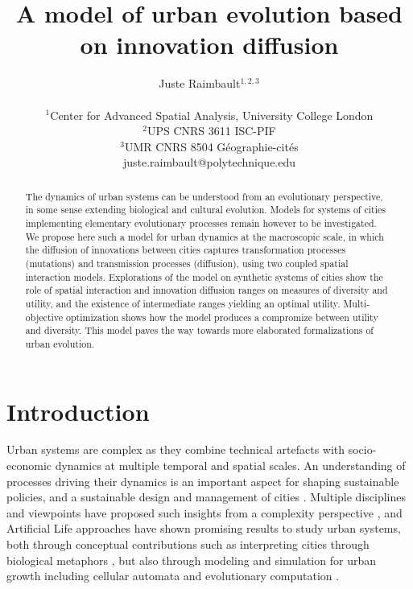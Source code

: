 \documentclass[letterpaper]{article}
\title{A model of urban evolution based on innovation diffusion}
\author{Juste Raimbault$^{1,2,3}$\\
\mbox{}\\
$^1$Center for Advanced Spatial Analysis, University College London\\
$^2$UPS CNRS 3611 ISC-PIF\\
$^3$UMR CNRS 8504 G{\'e}ographie-cit{\'e}s\medskip\\
juste.raimbault@polytechnique.edu} %
\begin{document}
\maketitle

\begin{abstract}
The dynamics of urban systems can be understood from an evolutionary perspective, in some sense extending biological and cultural evolution. Models for systems of cities implementing elementary evolutionary processes remain however to be investigated. We propose here such a model for urban dynamics at the macroscopic scale, in which the diffusion of innovations between cities captures transformation processes (mutations) and transmission processes (diffusion), using two coupled spatial interaction models. Explorations of the model on synthetic systems of cities show the role of spatial interaction and innovation diffusion ranges on measures of diversity and utility, and the existence of intermediate ranges yielding an optimal utility. Multi-objective optimization shows how the model produces a compromize between utility and diversity. This model paves the way towards more elaborated formalizations of urban evolution.
\end{abstract}



\section{Introduction}



Urban systems are complex as they combine technical artefacts with socio-economic dynamics at multiple temporal and spatial scales. An understanding of processes driving their dynamics is an important aspect for shaping sustainable policies, and a sustainable design and management of cities \citep{lobo2020urban}. Multiple disciplines and viewpoints have proposed such insights from a complexity perspective \citep{pumain2020conclusion}, and Artificial Life approaches have shown promising results to study urban systems, both through conceptual contributions such as interpreting cities through biological metaphors \citep{batty2009centenary}, but also through modeling and simulation for urban growth including cellular automata and evolutionary computation \citep{raimbault2020cities}.


\end{document}
